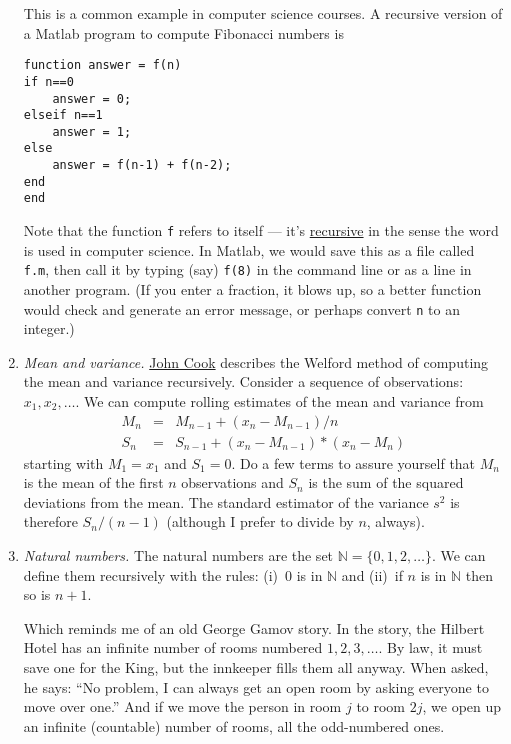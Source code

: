 \documentclass[11pt]{article}
\begin{document}
\begin{enumerate}
This is a common example in computer science courses.
A recursive version of a Matlab program to compute Fibonacci numbers is
\begin{verbatim}
function answer = f(n)
if n==0
    answer = 0;
elseif n==1
    answer = 1;
else
    answer = f(n-1) + f(n-2);
end
end
\end{verbatim}
Note that the function {\tt f} refers to itself --- it's
\href{http://en.wikipedia.org/wiki/Recursion_(computer_science)}{recursive}
in the sense the word is used in computer science.
In Matlab, we would save this as a file called {\tt f.m}, then
call it by typing (say) {\tt f(8)} in the command line or as a line in another program.
(If you enter a fraction, it blows up, so a better function
would check and generate an error message,
or perhaps convert {\tt n} to an integer.)

\item {\it Mean and variance.\/}
\href{http://www.johndcook.com/standard_deviation.html}{John Cook}
describes the Welford method of computing the mean and variance recursively.
Consider a sequence of observations:  $ x_1, x_2, \ldots $.
We can compute rolling estimates of the mean and variance from
\begin{eqnarray*}
    M_n &=& M_{n-1} + (x_n - M_{n-1}) / n \\
    S_n &=& S_{n-1} + (x_n - M_{n-1})*(x_n - M_n)
\end{eqnarray*}
starting with $ M_1= x_1$ and $S_1 = 0$.
Do a few terms to assure yourself that $M_n$ is the mean of the first $n$ observations
and $S_n$ is the sum of the squared deviations from the mean.
The standard estimator of the variance $s^2$ is therefore $ S_n/(n-1)$
(although I prefer to divide by $n$, always).

\item {\it Natural numbers.\/}
The natural numbers are the set $ \mathbb{N} = \{0,1,2,\ldots \} $.
We can  define them recursively with the rules: (i)~0 is in $\mathbb{N}$
and (ii)~if $n$ is in $\mathbb{N}$ then so is $n+1$.

Which reminds me of an old George Gamov story.
In the story, the Hilbert Hotel has an infinite number of rooms numbered $1, 2, 3, \ldots $.
By law, it must save one for the King, but the innkeeper fills them all anyway.
When asked, he says:  ``No problem, I can always get an open room by
asking everyone to move over one.''
And if we move the person in room $j$ to room $2j$,
we open up an infinite (countable) number of rooms, all the odd-numbered ones.


\end{enumerate}
\end{document}
